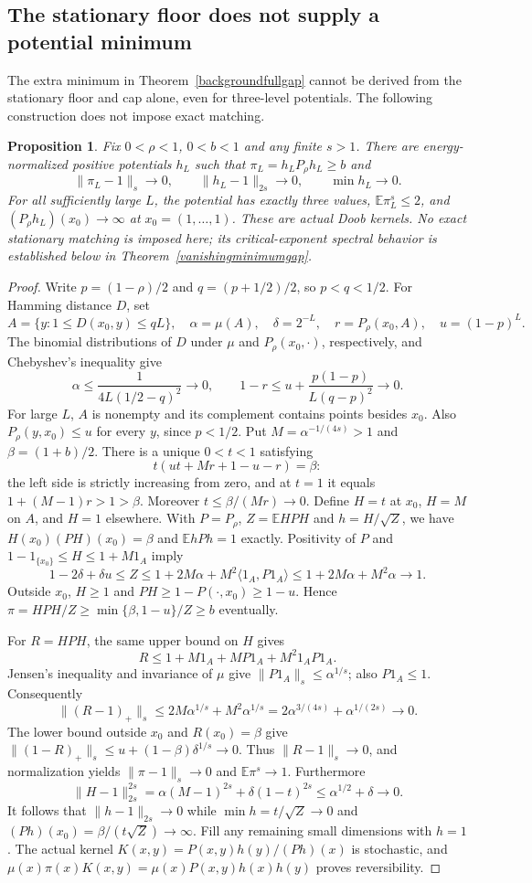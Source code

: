 \documentclass[11pt]{article}
\newcommand{\E}{\mathbb E}
\newtheorem{proposition}[theorem]{Proposition}
\begin{document}
\subsection{The stationary floor does not supply a potential minimum}
The extra minimum in Theorem~\ref{backgroundfullgap} cannot be derived
from the stationary floor and cap alone, even for three-level potentials.
The following construction does not impose exact matching.
\begin{proposition}\label{vanishingminimum}
Fix $0<\rho<1$, $0<b<1$ and any finite $s>1$.
There are energy-normalized positive potentials $h_L$ such that
$\pi_L=h_LP_\rho h_L\geq b$ and
\[
 \|\pi_L-1\|_s\longrightarrow0,\qquad
 \|h_L-1\|_{2s}\longrightarrow0,\qquad
 \min h_L\longrightarrow0.
\]
For all sufficiently large $L$, the potential has exactly three values,
$\E\pi_L^s\leq2$, and $(P_\rho h_L)(x_0)\to\infty$ at
$x_0=(1,\ldots,1)$. These are actual Doob kernels. No exact stationary
matching is imposed here; its critical-exponent spectral behavior is
established below in Theorem~\ref{vanishingminimumgap}.
\end{proposition}
\begin{proof}
Write $p=(1-\rho)/2$ and $q=(p+1/2)/2$, so $p<q<1/2$.
For Hamming distance $D$, set
\[
 A=\{y:1\leq D(x_0,y)\leq qL\},\quad
 \alpha=\mu(A),\quad\delta=2^{-L},\quad
 r=P_\rho(x_0,A),\quad u=(1-p)^L.
\]
The binomial distributions of $D$ under $\mu$ and $P_\rho(x_0,\cdot)$,
respectively, and Chebyshev's inequality give
\[
 \alpha\leq\frac1{4L(1/2-q)^2}\to0,\qquad
 1-r\leq u+\frac{p(1-p)}{L(q-p)^2}\to0.
\]
For large $L$, $A$ is nonempty and its complement contains points besides
$x_0$. Also $P_\rho(y,x_0)\leq u$ for every $y$, since $p<1/2$.
Put $M=\alpha^{-1/(4s)}>1$ and $\beta=(1+b)/2$.
There is a unique $0<t<1$ satisfying
\[
 t(ut+Mr+1-u-r)=\beta:
\]
the left side is strictly increasing from zero, and at $t=1$ it equals
$1+(M-1)r>1>\beta$. Moreover $t\leq\beta/(Mr)\to0$.
Define $H=t$ at $x_0$, $H=M$ on $A$, and $H=1$ elsewhere.
With $P=P_\rho$, $Z=\E HPH$ and $h=H/\sqrt Z$, we have
$H(x_0)(PH)(x_0)=\beta$ and $\E hPh=1$ exactly.
Positivity of $P$ and $1-1_{\{x_0\}}\leq H\leq1+M1_A$ imply
\[
 1-2\delta+\delta u\leq Z
 \leq1+2M\alpha+M^2\langle1_A,P1_A\rangle
 \leq1+2M\alpha+M^2\alpha\longrightarrow1.
\]
Outside $x_0$, $H\geq1$ and $PH\geq1-P(\cdot,x_0)\geq1-u$.
Hence $\pi=HPH/Z\geq\min\{\beta,1-u\}/Z\geq b$ eventually.

For $R=HPH$, the same upper bound on $H$ gives
\[
 R\leq1+M1_A+MP1_A+M^2 1_A P1_A.
\]
Jensen's inequality and invariance of $\mu$ give
$\|P1_A\|_s\leq\alpha^{1/s}$; also $P1_A\leq1$.
Consequently
\[
 \|(R-1)_+\|_s\leq2M\alpha^{1/s}+M^2\alpha^{1/s}
 =2\alpha^{3/(4s)}+\alpha^{1/(2s)}\to0.
\]
The lower bound outside $x_0$ and $R(x_0)=\beta$ give
$\|(1-R)_+\|_s\leq u+(1-\beta)\delta^{1/s}\to0$.
Thus $\|R-1\|_s\to0$, and normalization yields
$\|\pi-1\|_s\to0$ and $\E\pi^s\to1$.
Furthermore
\[
 \|H-1\|_{2s}^{2s}
 =\alpha(M-1)^{2s}+\delta(1-t)^{2s}
 \leq\alpha^{1/2}+\delta\to0.
\]
It follows that $\|h-1\|_{2s}\to0$ while
$\min h=t/\sqrt Z\to0$ and
$(Ph)(x_0)=\beta/(t\sqrt Z)\to\infty$.
Fill any remaining small dimensions with $h=1$.
The actual kernel $K(x,y)=P(x,y)h(y)/(Ph)(x)$ is stochastic, and
$\mu(x)\pi(x)K(x,y)=\mu(x)P(x,y)h(x)h(y)$ proves reversibility.
\end{proof}
\end{document}
